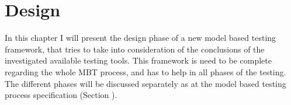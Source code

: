 \chapter{Design}
\label{cha:design}

In this chapter I will present the design phase of a new model based testing framework, that tries to take into consideration of the conclusions of the investigated available testing tools. This framework is need to be complete regarding the whole MBT process, and has to help in all phases of the testing. The different phases will be discussed separately as at the model based testing process specification (Section \cite{sec:process}).

